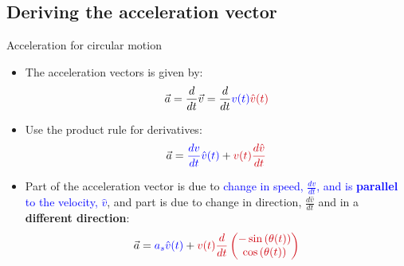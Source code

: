 \documentclass[aspectratio=169,
hyperref={colorlinks,urlcolor=blue}
]{beamer}
\begin{document}
\subsection{Deriving the acceleration vector}
\label{subsec:deriveaccvector}
\begin{frame}{Acceleration for circular motion}
\begin{itemize}
\item<1-> The acceleration vectors is given by:
\begin{align*}
\vec a = \frac{d}{dt} \vec v = \frac{d}{dt} \textcolor{blue}{v(t)} \textcolor{myred}{\hat v (t)}
\end{align*}
\item<2-> Use the product rule for derivatives:
\begin{align*}
\vec a = \textcolor{blue}{\frac{dv}{dt} \hat v (t)}+ \textcolor{myred}{v(t)\frac{d\hat v}{dt} }
\end{align*}
\item<3-> Part of the acceleration vector is due to \textcolor{blue}{change in speed, $\frac{dv}{dt}$, and is \textbf{parallel} to the velocity, $\hat v$}, and part is due to \textcolor{myred}{change in direction, $\frac{d\hat v}{dt}$ and in a \textbf{different direction}}:
\begin{align*}
\vec a = \textcolor{blue}{a_s \hat v (t)}+ \textcolor{myred}{v(t)\frac{d}{dt} \begin{pmatrix}
-\sin\left(\theta(t)\right)\\
\cos\left(\theta(t)\right)
\end{pmatrix}}
\end{align*}
\end{itemize}

\end{frame}
\end{document}
